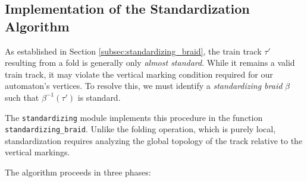 \iffalse

\subsection{Implementation of the Standardization Algorithm}
\label{subsec:standardization_implementation}

As established in Section \ref{subsec:standardizing_braid}, the train track $\tau'$ resulting from a fold is generally only \textit{almost standard}. While it remains a valid train track, it may violate the vertical marking condition required for our automaton's vertices. To resolve this, we must identify a \textit{standardizing braid} $\beta$ such that $\beta^{-1}(\tau')$ is standard.

The \texttt{standardizing} module implements this procedure in the function \texttt{standardizing\_braid}. Unlike the folding operation, which is purely local, standardization requires analyzing the global topology of the track relative to the vertical markings.

The algorithm proceeds in three phases:

